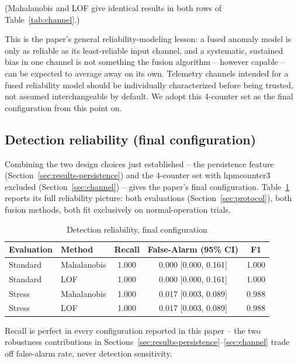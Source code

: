 \documentclass[conference]{IEEEtran}
\begin{document}
\noindent(Mahalanobis and LOF give identical results in both rows of Table~\ref{tab:channel}.)

This is the paper's general reliability-modeling lesson: a fused anomaly model is only as reliable as its least-reliable input channel, and a systematic, sustained bias in one channel is not something the fusion algorithm -- however capable -- can be expected to average away on its own. Telemetry channels intended for a fused reliability model should be individually characterized before being trusted, not assumed interchangeable by default. We adopt this 4-counter set as the final configuration from this point on.

\subsection{Detection reliability (final configuration)}
\label{sec:results-final}

Combining the two design choices just established -- the persistence feature (Section~\ref{sec:results-persistence}) and the 4-counter set with hpmcounter3 excluded (Section~\ref{sec:channel}) -- gives the paper's final configuration. Table~\ref{tab:final} reports its full reliability picture: both evaluations (Section~\ref{sec:protocol}), both fusion methods, both fit exclusively on normal-operation trials.

\begin{table}[htbp]
\centering
\caption{Detection reliability, final configuration}
\label{tab:final}
\begin{tabular}{@{}llccc@{}}
\toprule
Evaluation & Method & Recall & False-Alarm (95\% CI) & F1 \\
\midrule
Standard & Mahalanobis & 1.000 & 0.000 [0.000, 0.161] & 1.000 \\
Standard & LOF         & 1.000 & 0.000 [0.000, 0.161] & 1.000 \\
Stress   & Mahalanobis & 1.000 & 0.017 [0.003, 0.089] & 0.988 \\
Stress   & LOF         & 1.000 & 0.017 [0.003, 0.089] & 0.988 \\
\bottomrule
\end{tabular}
\end{table}

Recall is perfect in every configuration reported in this paper -- the two robustness contributions in Sections~\ref{sec:results-persistence}--\ref{sec:channel} trade off false-alarm rate, never detection sensitivity.
\end{document}
